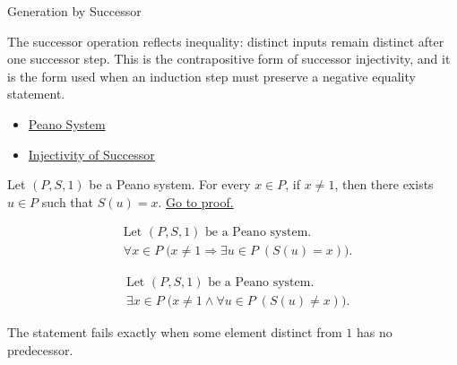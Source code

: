 \begin{topicbox}{Generation by Successor}
\begin{remark*}[Interpretation]
The successor operation reflects inequality: distinct inputs remain distinct
after one successor step. This is the contrapositive form of successor
injectivity, and it is the form used when an induction step must preserve a
negative equality statement.
\end{remark*}

\begin{remark*}[Dependencies]
\begin{itemize}
  \item \hyperref[def:peano-system]{Peano System}
  \item \hyperref[ax:peano-successor-injective]{Injectivity of Successor}
\end{itemize}
\end{remark*}

\begin{tcolorbox}[colback=corbox, colframe=corborder, arc=2pt,
  left=6pt, right=6pt, top=4pt, bottom=4pt,
  title={\small\textbf{Corollary (Non-One Elements Have a Predecessor)}} ,
  fonttitle=\small\bfseries]
\begin{corollary}
\label{cor:non-one-elements-have-a-predecessor}
Let $(P,S,1)$ be a Peano system. For every $x \in P$, if $x \neq 1$, then
there exists $u \in P$ such that $S(u)=x$.
\hyperref[prf:non-one-elements-have-a-predecessor]{Go to proof.}
\end{corollary}
\end{tcolorbox}

\begin{remark*}
\[
\begin{aligned}
&\text{Let } (P,S,1) \text{ be a Peano system.}\\
&\forall x \in P\;\bigl(x\neq 1 \Longrightarrow
\exists u \in P\;(S(u)=x)\bigr).
\end{aligned}
\]
\end{remark*}

\begin{remark*}
\[
\begin{aligned}
&\text{Let } (P,S,1) \text{ be a Peano system.}\\
&\exists x \in P\;\bigl(x\neq 1 \land
\forall u \in P\;(S(u)\neq x)\bigr).
\end{aligned}
\]
\end{remark*}

\begin{remark*}
The statement fails exactly when some element distinct from $1$ has no
predecessor.
\end{remark*}


\end{topicbox}
